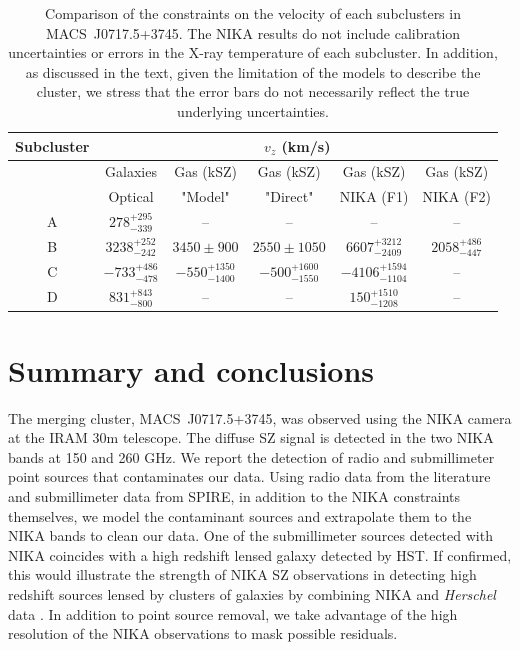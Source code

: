 \documentclass[twocolumn,traditabstract]{aa}
\begin{document}
\begin{table}[h]
\caption{{\footnotesize Comparison of the constraints on the velocity of each subclusters in \mbox{MACS~J0717.5+3745}. The NIKA results do not include calibration uncertainties or errors in the X-ray temperature of each subcluster. In addition, as discussed in the text, given the limitation of the models to describe the cluster, we stress that the error bars do not necessarily reflect the true underlying uncertainties.}}
\begin{center}
\begin{tabular}{c|c|c|c|c|c}
\hline
\hline
Subcluster & \multicolumn{5}{c}{$v_z$ (km/s)} \\
\hline
 & Galaxies & Gas (kSZ) & Gas (kSZ) & Gas (kSZ) & Gas (kSZ) \\
 & Optical \citep{Ma2009} & "Model" \citep{Sayers2013} & "Direct" \citep{Sayers2013} & NIKA (F1) & NIKA (F2) \\
\hline
A & $278^{+295}_{-339}$ & -- & -- & -- & -- \\
B & $3238^{+252}_{-242}$ & $3450 \pm 900$ & $2550 \pm 1050$ & $6607_{-2409}^{+3212}$ & $2058_{-447}^{+486}$ \\
C & $-733^{+486}_{-478}$ & $-550^{+1350}_{-1400}$ & $-500^{+1600}_{-1550}$ & $-4106_{-1104}^{+1594}$ & -- \\
D & $831^{+843}_{-800}$ & -- & -- & $150_{-1208}^{+1510}$ & -- \\
\hline
\end{tabular}
\end{center}
\label{tab:comparison_velocity_measurements}
\end{table}

\section{Summary and conclusions}\label{sec:conclusions} 
The merging cluster, \mbox{MACS~J0717.5+3745}, was observed using the NIKA camera at the IRAM 30m telescope. The diffuse SZ signal is detected in the two NIKA bands at 150 and 260 GHz. We report the detection of radio and submillimeter point sources that contaminates our data. Using radio data from the literature and submillimeter data from SPIRE, in addition to the NIKA constraints themselves, we model the contaminant sources and extrapolate them to the NIKA bands to clean our data. One of the submillimeter sources detected with NIKA coincides with a high redshift lensed galaxy detected by HST. If confirmed, this would illustrate the strength of NIKA SZ observations in detecting high redshift sources lensed by clusters of galaxies by combining NIKA and \textit{Herschel} data \citep[see also][]{Adam2015,Adam2016}. In addition to point source removal, we take advantage of the high resolution of the NIKA observations to mask possible residuals.
\end{document}

